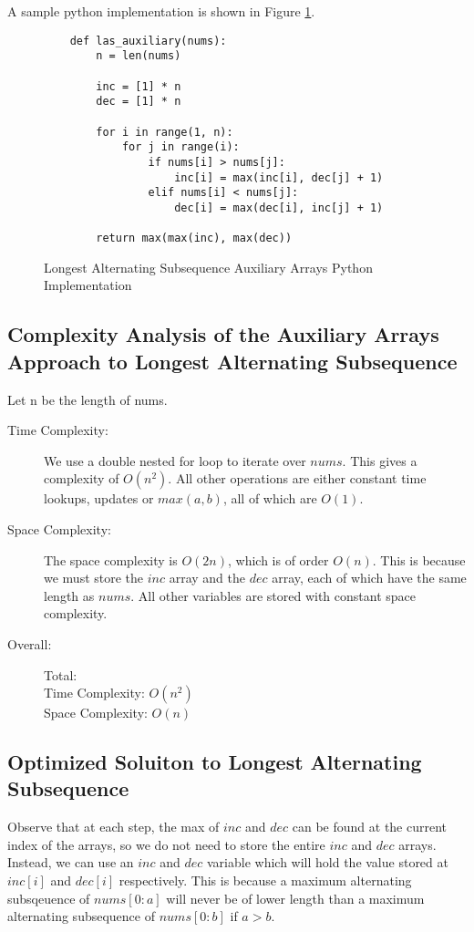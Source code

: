 A sample python implementation is shown in Figure \ref{fig:las-auxiliary}.

\begin{figure}[H]
    \centering
    \begin{lstlisting}
    def las_auxiliary(nums):
        n = len(nums)
        
        inc = [1] * n
        dec = [1] * n
    
        for i in range(1, n):
            for j in range(i):
                if nums[i] > nums[j]:
                    inc[i] = max(inc[i], dec[j] + 1)
                elif nums[i] < nums[j]:
                    dec[i] = max(dec[i], inc[j] + 1)

        return max(max(inc), max(dec))
    \end{lstlisting}
    \caption{Longest Alternating Subsequence Auxiliary Arrays Python Implementation}
    \label{fig:las-auxiliary}
\end{figure}

\subsection{Complexity Analysis of the Auxiliary Arrays Approach to Longest Alternating Subsequence}
Let n be the length of nums.
\begin{description}
    \item[Time Complexity:]
        We use a double nested for loop to iterate over $nums$.
        This gives a complexity of $O(n^2)$.
        All other operations are either constant time lookups, updates or $max(a,b)$,
        all of which are $O(1)$.
        
    \item[Space Complexity:] 
        The space complexity is $O(2n)$, which is of order $O(n)$.
        This is because we must store the $inc$ array and the $dec$ array,
        each of which have the same length as $nums$.
        All other variables are stored with constant space complexity.

        
    \item[Overall:] Total:\\
        Time Complexity: $O(n^2)$\\
        Space Complexity: $O(n)$
    
\end{description}


\subsection{Optimized Soluiton to Longest Alternating Subsequence}
Observe that at each step, the max of $inc$ and $dec$ can be found at the current index of the arrays,
so we do not need to store the entire $inc$ and $dec$ arrays.
Instead, we can use an $inc$ and $dec$ variable which will hold the value stored at $inc[i]$ and $dec[i]$ respectively.
This is because a maximum alternating subsqeuence of $nums[0:a]$ will never be of lower length than a maximum alternating subsequence of $nums[0:b]$ if $a > b$.


